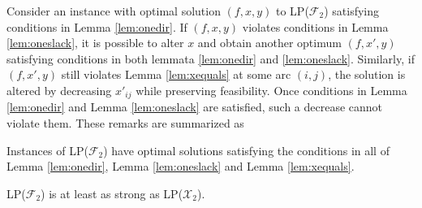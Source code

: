 Consider an instance with optimal solution $(f,x,y)$ to LP($\mathcal{F}_2$) satisfying conditions in Lemma \ref{lem:onedir}.
If $(f,x,y)$ violates conditions in Lemma \ref{lem:oneslack}, it is possible to alter $x$ and obtain another optimum $(f,x',y)$ satisfying conditions in both lemmata \ref{lem:onedir} and \ref{lem:oneslack}.
Similarly, if $(f,x',y)$ still violates Lemma \ref{lem:xequals} at some arc $(i,j)$, the solution is altered by decreasing $x'_{ij}$ while preserving feasibility.
Once conditions in Lemma \ref{lem:onedir} and Lemma \ref{lem:oneslack} are satisfied, such a decrease cannot violate them.
These remarks are summarized as 
\begin{obs}
Instances of LP($\mathcal{F}_2$) have optimal solutions satisfying the conditions in all of Lemma \ref{lem:onedir}, Lemma \ref{lem:oneslack} and Lemma \ref{lem:xequals}.
\end{obs}
\begin{prop}
\label{prop:f1strx2}
LP($\mathcal{F}_2$) is at least as strong as LP($\mathcal{X}_2$). 
\end{prop}
